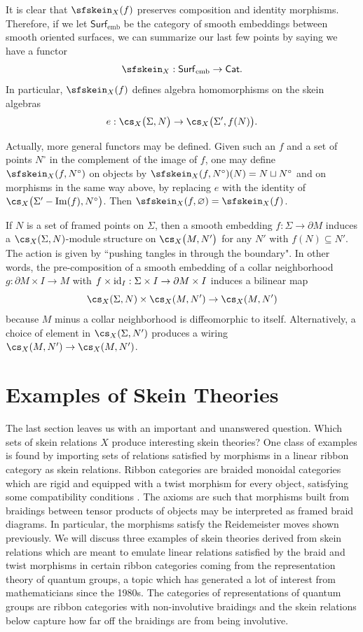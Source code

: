 It is clear that $\sfskein_X(f)$ preserves composition and identity morphisms. Therefore, if we let $\mathsf{Surf}_{\textrm{emb}}$ be the category of smooth embeddings between smooth oriented surfaces, we can summarize our last few points by saying we have a functor
\[
\sfskein_X: \mathsf{Surf}_{\textrm{emb}} \to \mathsf{Cat}.
\]
In particular, $\sfskein_X(f)$ defines algebra homomorphisms on the skein algebras
\[e: \cs_X\big(\Sigma, N\big) \to \cs_X\big(\Sigma', f(N)\big).\]

Actually, more general functors may be defined. Given such an $f$ and a set of points $N^\circ$ in the complement of the image of $f$, one may define $\sfskein_X(f, N^\circ)$ on objects by $\sfskein_X(f, N^\circ)(N) = N \sqcup N^\circ$ and on morphisms in the same way above, by replacing $e$ with the identity of $\cs_X\big( \Sigma' - \im(f), N^\circ \big)$. Then $\sfskein_X(f, \varnothing) = \sfskein_X(f)$.

\begin{remark} \label{rem:skeinaction}
If $N$ is a set of framed points on $\Sigma$, then a smooth embedding $f: \Sigma \to \partial M$ induces a $\cs_X(\Sigma, N)$-module structure on $\cs_X\big(M, N'\big)$ for any $N'$ with $f(N) \subseteq N'$. The action is given by ``pushing tangles in through the boundary". In other words, the pre-composition of a smooth embedding of a collar neighborhood $g: \partial M \times I \to M$ with $f \times {\rm{id}}_I: \Sigma\times I \to \partial M \times I$ induces a bilinear map
\[
\cs_X(\Sigma, N) \times \cs_X(M, N') \to \cs_X(M, N')
\]
because $M$ minus a collar neighborhood is diffeomorphic to itself. Alternatively, a choice of element in $\cs_X(\Sigma, N')$ produces a wiring $\cs_X(M, N') \to \cs_X(M, N')$.
\end{remark}


\section{Examples of Skein Theories} \label{sec:skeintheories}

The last section leaves us with an important and unanswered question. Which sets of skein relations $X$ produce interesting skein theories? One class of examples is found by importing sets of relations satisfied by morphisms in a linear ribbon category as skein relations. Ribbon categories are braided monoidal categories which are rigid and equipped with a twist morphism for every object, satisfying some compatibility conditions \cite{RT90}. The axioms are such that morphisms built from braidings between tensor products of objects may be interpreted as framed braid diagrams. In particular, the morphisms satisfy the Reidemeister moves shown previously. We will discuss three examples of skein theories derived from skein relations which are meant to emulate linear relations satisfied by the braid and twist morphisms in certain ribbon categories coming from the representation theory of quantum groups, a topic which has generated a lot of interest from mathematicians since the 1980s. The categories of representations of quantum groups are ribbon categories with non-involutive braidings and the skein relations below capture how far off the braidings are from being involutive.  

